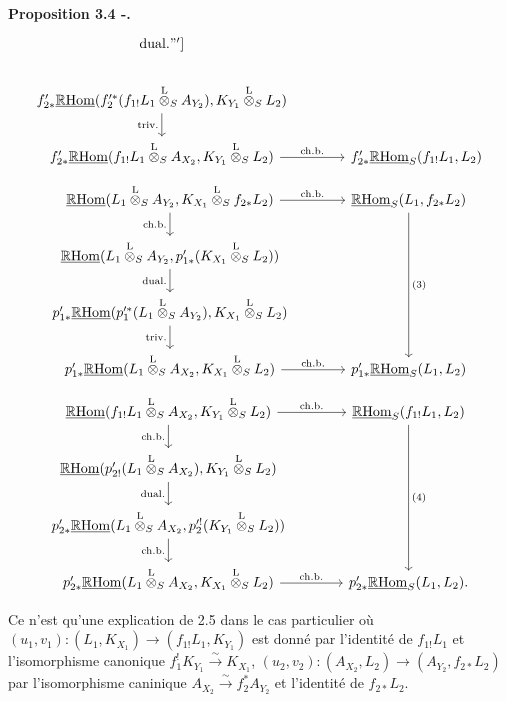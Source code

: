 \documentclass[11pt]{article}
\newenvironment{statement}[1]{\par\medskip\noindent\textbf{#1.}\ }{\par\medskip}
\newcommand{\R}{\mathbb{R}}\newcommand{\RHomCore}{\mathbb{R}\mathrm{Hom}}
\providecommand{\RHom}{\RHomCore}
\providecommand{\uRHom}{\underline{\RHom}}
\providecommand{\RHom}{\RHomCore}
\providecommand{\RHom}{\R\mathcal{H}om}
\providecommand{\R}{\mathrm R}
\providecommand{\RHom}{\RHomCore}
\begin{document}
\begin{statement}{Proposition 3.4 -}
\[\begin{tikzcd}[column sep=3.7em,row sep=1.7em]
\mathrm{dual.}"']
& \\
f'_{2*}\uRHom(f_2'^*(f_{1!}L_1\overset{\mathrm{L}}{\otimes}_S A_{Y_2}),K_{Y_1}\overset{\mathrm{L}}{\otimes}_S L_2) \arrow[d,"\mathrm{triv.}"']
& \\
f'_{2*}\uRHom(f_{1!}L_1\overset{\mathrm{L}}{\otimes}_S A_{X_2},K_{Y_1}\overset{\mathrm{L}}{\otimes}_S L_2) \arrow[r,"\mathrm{ch.b.}"]
& f'_{2*}\uRHom_S(f_{1!}L_1,L_2)
\end{tikzcd}
\]
\[
\begin{tikzcd}[column sep=3.7em,row sep=1.7em]
\uRHom(L_1\overset{\mathrm{L}}{\otimes}_S A_{Y_2},K_{X_1}\overset{\mathrm{L}}{\otimes}_S f_{2*}L_2)
  \arrow[r,"\mathrm{ch.b.}"] \arrow[d,"\mathrm{ch.b.}"']
& \uRHom_S(L_1,f_{2*}L_2) \arrow[ddd,"(3)"] \\
\uRHom(L_1\overset{\mathrm{L}}{\otimes}_S A_{Y_2},p'_{1*}(K_{X_1}\overset{\mathrm{L}}{\otimes}_S L_2)) \arrow[d,"\mathrm{dual.}"']
& \\
p'_{1*}\uRHom(p_1'^*(L_1\overset{\mathrm{L}}{\otimes}_S A_{Y_2}),K_{X_1}\overset{\mathrm{L}}{\otimes}_S L_2) \arrow[d,"\mathrm{triv.}"']
& \\
p'_{1*}\uRHom(L_1\overset{\mathrm{L}}{\otimes}_S A_{X_2},K_{X_1}\overset{\mathrm{L}}{\otimes}_S L_2) \arrow[r,"\mathrm{ch.b.}"]
& p'_{1*}\uRHom_S(L_1,L_2)
\end{tikzcd}
\]
\[
\begin{tikzcd}[column sep=3.7em,row sep=1.7em]
\uRHom(f_{1!}L_1\overset{\mathrm{L}}{\otimes}_S A_{X_2},K_{Y_1}\overset{\mathrm{L}}{\otimes}_S L_2)
  \arrow[r,"\mathrm{ch.b.}"] \arrow[d,"\mathrm{ch.b.}"']
& \uRHom_S(f_{1!}L_1,L_2) \arrow[ddd,"(4)"] \\
\uRHom(p'_{2!}(L_1\overset{\mathrm{L}}{\otimes}_S A_{X_2}),K_{Y_1}\overset{\mathrm{L}}{\otimes}_S L_2) \arrow[d,"\mathrm{dual.}"']
& \\
p'_{2*}\uRHom(L_1\overset{\mathrm{L}}{\otimes}_S A_{X_2},p_2'^!(K_{Y_1}\overset{\mathrm{L}}{\otimes}_S L_2)) \arrow[d,"\mathrm{ch.b.}"']
& \\
p'_{2*}\uRHom(L_1\overset{\mathrm{L}}{\otimes}_S A_{X_2},K_{X_1}\overset{\mathrm{L}}{\otimes}_S L_2) \arrow[r,"\mathrm{ch.b.}"]
& p'_{2*}\uRHom_S(L_1,L_2).
\end{tikzcd}
\]
\end{statement}
Ce n'est qu'une explication de 2.5 dans le cas particulier où $(u_1,v_1):(L_1,K_{X_1})\to(f_{1!}L_1,K_{Y_1})$ est donné par l'identité de $f_{1!}L_1$ et l'isomorphisme canonique $f_1^!K_{Y_1}\xrightarrow{\sim}K_{X_1}$, $(u_2,v_2):(A_{X_2},L_2)\to(A_{Y_2},f_{2*}L_2)$ par l'isomorphisme caninique $A_{X_2}\xrightarrow{\sim}f_2^*A_{Y_2}$ et l'identité de $f_{2*}L_2$.
\end{document}
